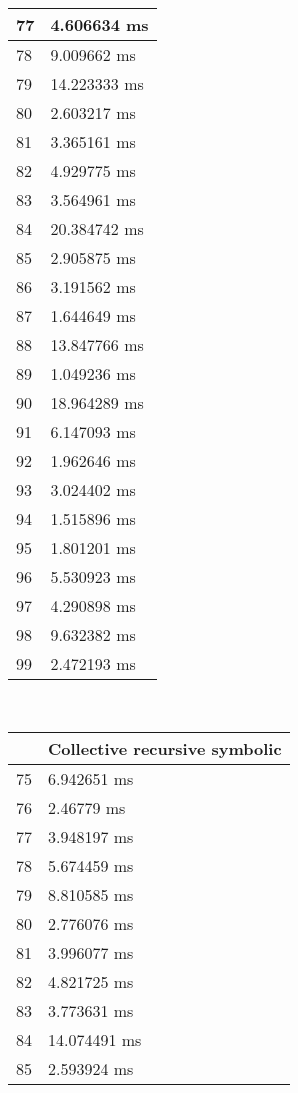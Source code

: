 \begin{multicols}{2}
\begin{tabular}{|l|l|}
		77 & 4.606634 ms \\ \hline
		78 & 9.009662 ms \\ \hline
		79 & 14.223333 ms \\ \hline
		80 & 2.603217 ms \\ \hline
		81 & 3.365161 ms \\ \hline
		82 & 4.929775 ms \\ \hline
		83 & 3.564961 ms \\ \hline
		84 & 20.384742 ms \\ \hline
		85 & 2.905875 ms \\ \hline
		86 & 3.191562 ms \\ \hline
		87 & 1.644649 ms \\ \hline
		88 & 13.847766 ms \\ \hline
		89 & 1.049236 ms \\ \hline
		90 & 18.964289 ms \\ \hline
		91 & 6.147093 ms \\ \hline
		92 & 1.962646 ms \\ \hline
		93 & 3.024402 ms \\ \hline
		94 & 1.515896 ms \\ \hline
		95 & 1.801201 ms \\ \hline
		96 & 5.530923 ms \\ \hline
		97 & 4.290898 ms \\ \hline
		98 & 9.632382 ms \\ \hline
		99 & 2.472193 ms \\ \hline
	\end{tabular}\\
	\begin{tabular}{|l|l|}
		\hline
		& Collective recursive symbolic \\ \hline
		75 & 6.942651 ms \\ \hline
		76 & 2.46779 ms \\ \hline
		77 & 3.948197 ms \\ \hline
		78 & 5.674459 ms \\ \hline
		79 & 8.810585 ms \\ \hline
		80 & 2.776076 ms \\ \hline
		81 & 3.996077 ms \\ \hline
		82 & 4.821725 ms \\ \hline
		83 & 3.773631 ms \\ \hline
		84 & 14.074491 ms \\ \hline
		85 & 2.593924 ms \\ \hline

\end{tabular}
\end{multicols}
